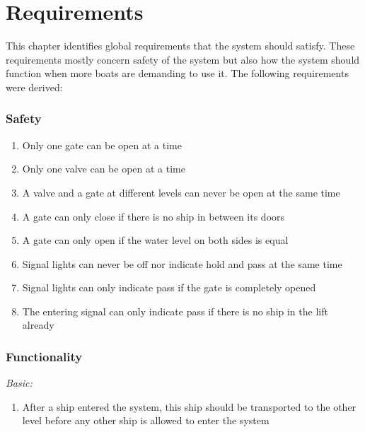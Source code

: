 \section{Requirements}
This chapter identifies global requirements that the system should satisfy. These requirements mostly concern safety of the system but also how the system should function when more boats are demanding to use it. The following requirements were derived:

\subsubsection*{Safety}
\begin{enumerate}
	\item Only one gate can be open at a time
	\item Only one valve can be open at a time
	\item A valve and a gate at different levels can never be open at the same time
	\item A gate can only close if there is no ship in between its doors
	\item A gate can only open if the water level on both sides is equal
	\item Signal lights can never be off nor indicate hold and pass at the same time
	\item Signal lights can only indicate pass if the gate is completely opened
	\item The entering signal can only indicate pass if there is no ship in the lift already
\end{enumerate}

\subsubsection*{Functionality}
\textit{Basic:}
\begin{enumerate}
	\item After a ship entered the system, this ship should be transported to the other level before any other ship is allowed to enter the system
\end{enumerate}
